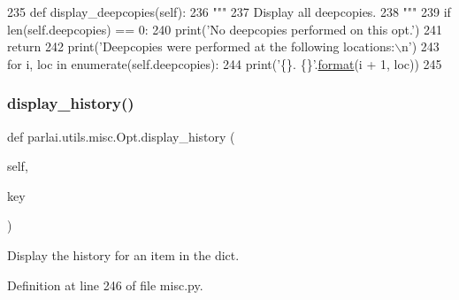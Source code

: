 \begin{DoxyCode}
235     \textcolor{keyword}{def }display\_deepcopies(self):
236         \textcolor{stringliteral}{"""}
237 \textcolor{stringliteral}{        Display all deepcopies.}
238 \textcolor{stringliteral}{        """}
239         \textcolor{keywordflow}{if} len(self.deepcopies) == 0:
240             print(\textcolor{stringliteral}{'No deepcopies performed on this opt.'})
241             \textcolor{keywordflow}{return}
242         print(\textcolor{stringliteral}{'Deepcopies were performed at the following locations:\(\backslash\)n'})
243         \textcolor{keywordflow}{for} i, loc \textcolor{keywordflow}{in} enumerate(self.deepcopies):
244             print(\textcolor{stringliteral}{'\{\}. \{\}'}.\hyperlink{namespaceparlai_1_1chat__service_1_1services_1_1messenger_1_1shared__utils_a32e2e2022b824fbaf80c747160b52a76}{format}(i + 1, loc))
245 
\end{DoxyCode}
\mbox{\label{classparlai_1_1utils_1_1misc_1_1Opt_aee1d325bb2691ce4c007075d6f8abffc}} 
\subsubsection{\texorpdfstring{display\+\_\+history()}{display\_history()}}
{\footnotesize\ttfamily def parlai.\+utils.\+misc.\+Opt.\+display\+\_\+history (\begin{DoxyParamCaption}\item[{}]{self,  }\item[{}]{key }\end{DoxyParamCaption})}

\begin{DoxyVerb}Display the history for an item in the dict.
\end{DoxyVerb}
 

Definition at line 246 of file misc.\+py.


